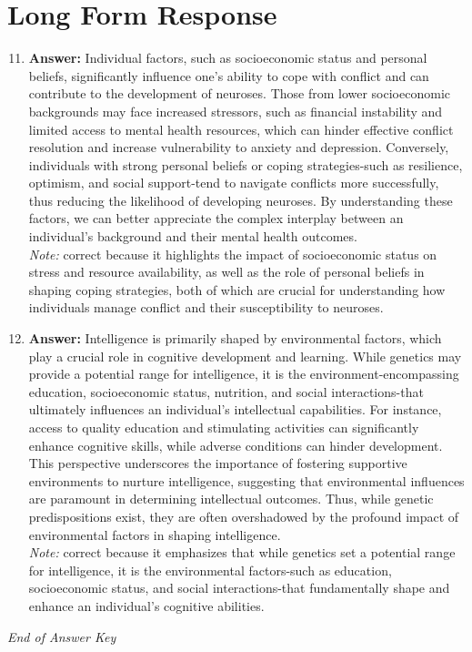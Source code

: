 \documentclass[12pt]{article}
\begin{document}
\section*{Long Form Response}
\begin{enumerate}[label=\arabic*.]
\setcounter{enumi}{10}
\item \textbf{Answer:} Individual factors, such as socioeconomic status and personal beliefs, significantly influence one's ability to cope with conflict and can contribute to the development of neuroses. Those from lower socioeconomic backgrounds may face increased stressors, such as financial instability and limited access to mental health resources, which can hinder effective conflict resolution and increase vulnerability to anxiety and depression. Conversely, individuals with strong personal beliefs or coping strategies-such as resilience, optimism, and social support-tend to navigate conflicts more successfully, thus reducing the likelihood of developing neuroses. By understanding these factors, we can better appreciate the complex interplay between an individual's background and their mental health outcomes.
\\ \textit{Note:} correct because it highlights the impact of socioeconomic status on stress and resource availability, as well as the role of personal beliefs in shaping coping strategies, both of which are crucial for understanding how individuals manage conflict and their susceptibility to neuroses.
\item \textbf{Answer:} Intelligence is primarily shaped by environmental factors, which play a crucial role in cognitive development and learning. While genetics may provide a potential range for intelligence, it is the environment-encompassing education, socioeconomic status, nutrition, and social interactions-that ultimately influences an individual's intellectual capabilities. For instance, access to quality education and stimulating activities can significantly enhance cognitive skills, while adverse conditions can hinder development. This perspective underscores the importance of fostering supportive environments to nurture intelligence, suggesting that environmental influences are paramount in determining intellectual outcomes. Thus, while genetic predispositions exist, they are often overshadowed by the profound impact of environmental factors in shaping intelligence.
\\ \textit{Note:} correct because it emphasizes that while genetics set a potential range for intelligence, it is the environmental factors-such as education, socioeconomic status, and social interactions-that fundamentally shape and enhance an individual's cognitive abilities.
\end{enumerate}

\vfill
\noindent\textit{End of Answer Key}
\end{document}
